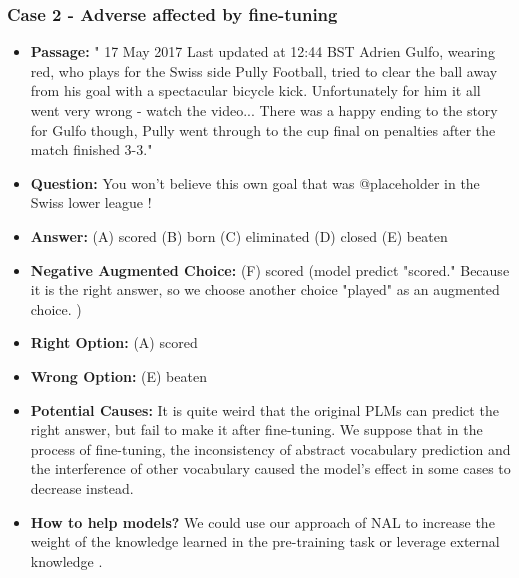 \documentclass[11pt,a4paper]{article}
\begin{document}
\subsubsection*{Case 2 - Adverse affected by fine-tuning}
\begin{itemize}
\setlength{\itemsep}{0pt}
\setlength{\parsep}{0pt}
\setlength{\parskip}{0pt}
    \item \textbf{Passage:} " 17 May 2017 Last updated at 12:44 BST Adrien Gulfo, wearing red, who plays for the Swiss side Pully Football, tried to clear the ball away from his goal with a spectacular bicycle kick. Unfortunately for him it all went very wrong - watch the video... There was a happy ending to the story for Gulfo though, Pully went through to the cup final on penalties after the match finished 3-3."
    \item \textbf{Question:} You won't believe this own goal that was @placeholder in the Swiss lower league !
    \item \textbf{Answer:} (A) scored (B) born (C) eliminated (D) closed (E) beaten
    \item \textbf{Negative Augmented Choice:} (F) scored  (model predict "scored." Because it is the right answer, so we choose another choice "played" as an augmented choice. )
    \item \textbf{Right Option:} (A) scored
    \item \textbf{Wrong Option:} (E) beaten
    \item \textbf{Potential Causes:} It is quite weird that the original PLMs can predict the right answer, but fail to make it after fine-tuning. 
    We suppose that in the process of fine-tuning, the inconsistency of abstract vocabulary prediction and the interference of other vocabulary caused the model's effect in some cases to decrease instead.
    \item\textbf{How to help models?} We could use our approach of NAL to increase the weight of the knowledge learned in the pre-training task or leverage external knowledge \cite{zhang-etal-2019-long,DBLP:conf/www/ZhangDSCZC20,DBLP:conf/coling/YuZDYZC20,DBLP:conf/emnlp/ZhangDLCZC20}.
\end{itemize}
\end{document}
